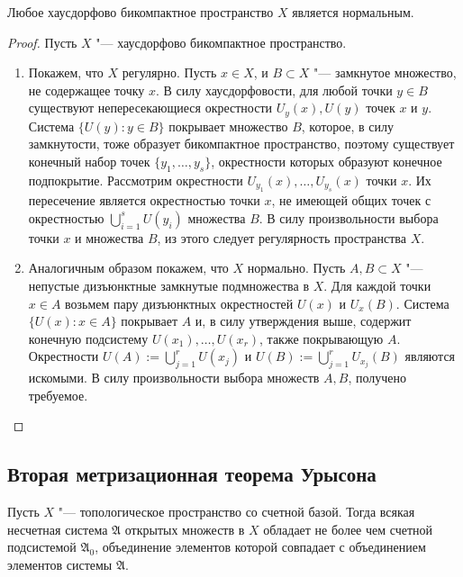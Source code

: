 \begin{theorem}
    Любое хаусдорфово бикомпактное пространство $X$ является нормальным.
\end{theorem}

\begin{proof}
    Пусть $X$ "--- хаусдорфово бикомпактное пространство.
    \begin{enumerate}
        \item Покажем, что $X$ регулярно. Пусть $x \in X$, и $B \subset X$ "--- замкнутое множество, не содержащее точку $x$. В силу хаусдорфовости, для любой точки $y \in B$ существуют непересекающиеся окрестности $U_y(x), U(y)$ точек $x$ и $y$. Система $\lbrace U(y): y\in B\rbrace$ покрывает множество $B$, которое, в силу замкнутости, тоже образует бикомпактное пространство, поэтому существует конечный набор точек $\{y_1,\ldots, y_s\}$, окрестности которых образуют конечное подпокрытие. Рассмотрим окрестности $U_{y_1}(x), \dotsc, U_{y_s}(x)$ точки $x$. Их пересечение является окрестностью точки $x$, не имеющей общих точек с окрестностью $\bigcup_{i = 1}^sU(y_i)$ множества $B$. В силу произвольности выбора точки $x$ и множества $B$, из этого следует регулярность пространства $X$.

        \item Аналогичным образом покажем, что $X$ нормально. Пусть $A, B \subset X$ "--- непустые дизъюнктные замкнутые подмножества в $X$. Для каждой точки $x \in A$ возьмем пару дизъюнктных окрестностей $U(x)$ и $U_x(B)$. Система $\lbrace U(x): x \in A\rbrace$ покрывает $A$ и, в силу утверждения выше, содержит конечную подсистему $U(x_1),\ldots, U(x_r)$, также покрывающую $A$. Окрестности $U(A) := \bigcup_{j = 1}^rU(x_j)$ и $U(B) := \bigcup_{j = 1}^rU_{x_j}(B)$ являются искомыми. В силу произвольности выбора множеств $A, B$, получено требуемое.\qedhere
    \end{enumerate}
\end{proof}

\subsection{Вторая метризационная теорема Урысона}

\begin{theorem}
    Пусть $X$ "--- топологическое пространство со счетной базой. Тогда всякая несчетная система $\mathfrak{A}$ открытых множеств в $X$ обладает не более чем счетной подсистемой $\mathfrak{A}_0$, объединение элементов которой совпадает с объединением элементов системы $\mathfrak{A}$.
\end{theorem}

